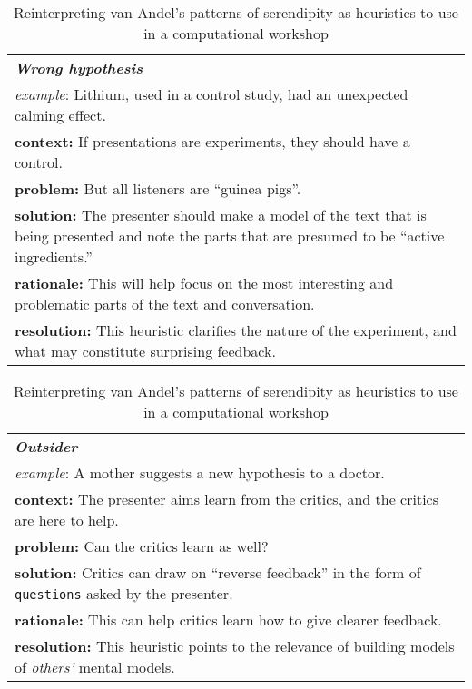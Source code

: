 \begin{table}[p]
\begin{tabular}{p{}}
{\bf\emph{Wrong hypothesis}}  \\[.1cm]
\emph{example}:  Lithium, used in a control study, had an unexpected calming effect. \\[.1cm]
{\bf context:} If presentations are experiments, they should have a control. \\
{\bf problem:} But all listeners are ``guinea pigs''.\\
{\bf solution:} The presenter should make a model of the text that is being presented and note the parts that are presumed to be ``active ingredients.'' \\
{\bf rationale:} This will help focus on the most interesting and problematic parts of the text and conversation.\\
{\bf resolution:} This heuristic clarifies the nature of the experiment, and what may constitute surprising feedback. \\
\end{tabular}
\medskip

\begin{tabular}{p{}}
{\bf\emph{Outsider}}  \\[.1cm]
\emph{example}:  A mother suggests a new hypothesis to a doctor. \\[.1cm]
{\bf context:} The presenter aims learn from the critics, and the critics are here to help. \\
{\bf problem:} Can the critics learn as well?\\
{\bf solution:} Critics can draw on ``reverse feedback'' in the form of {\tt questions} asked by the presenter.\\
{\bf rationale:} This can help critics learn how to give clearer feedback.\\
{\bf resolution:} This heuristic points to the relevance of building models of \emph{others'} mental models.\\
\end{tabular}
\vspace{.1cm}
\caption{Reinterpreting van Andel's patterns of serendipity as heuristics to use in a computational workshop\label{tab:reinterpret}}
\end{table}

\bigskip




